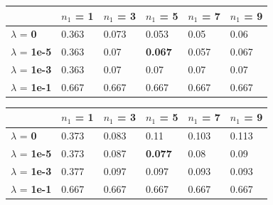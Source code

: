 \documentclass[10pt]{article}
\begin{document}
\begin{table}
\centering
\begin{tabular}{llllll}
\toprule
& $n_1$ = \bf{1} & $n_1$ =  \bf{3} & $n_1$ =  \bf{5} & $n_1$ =  \bf{7} & $n_1$ =  \bf{9} \\
\midrule
$\lambda$ = \bf{0} &       0.363 & 0.073 & 0.053 & 0.05  & 0.06  \\
$\lambda$ = \bf{1e-5} &   0.363 & 0.07  & \bf{0.067} & 0.057 & 0.067 \\
$\lambda$ = \bf{1e-3} &   0.363 & 0.07  & 0.07  & 0.07  & 0.07  \\
$\lambda$ = \bf{1e-1} &   0.667 & 0.667 & 0.667 & 0.667 & 0.667 \\
\bottomrule
\end{tabular}
\end{table}
	
\begin{table}
\centering
\begin{tabular}{llllll}
\toprule
& $n_1$ = \bf{1} & $n_1$ =  \bf{3} & $n_1$ =  \bf{5} & $n_1$ =  \bf{7} & $n_1$ =  \bf{9} \\
\midrule
$\lambda$ = \bf{0} &        0.373 & 0.083 & 0.11  & 0.103 & 0.113 \\
$\lambda$ = \bf{1e-5} &    0.373 & 0.087 & \bf{0.077} & 0.08  & 0.09  \\
$\lambda$ = \bf{1e-3} &    0.377 & 0.097 & 0.097 & 0.093 & 0.093 \\
$\lambda$ = \bf{1e-1} &    0.667 & 0.667 & 0.667 & 0.667 & 0.667 \\
\bottomrule
\end{tabular}
\end{table}
	
	
\end{document}
